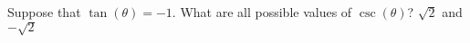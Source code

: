 {Suppose that $\tan{(\theta)}=-1$. What are all possible values of $\csc{(\theta)}$?}
{$\sqrt{2}$ and $-\sqrt{2}$}
